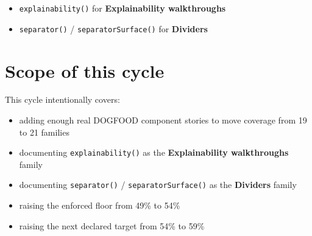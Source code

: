 \begin{itemize}
\tightlist
\item
  \texttt{e\allowbreak{}x\allowbreak{}p\allowbreak{}l\allowbreak{}a\allowbreak{}i\allowbreak{}n\allowbreak{}a\allowbreak{}b\allowbreak{}i\allowbreak{}l\allowbreak{}i\allowbreak{}t\allowbreak{}y\allowbreak{}(\allowbreak{})} for \textbf{Explainability walkthroughs}
\item
  \texttt{s\allowbreak{}e\allowbreak{}p\allowbreak{}a\allowbreak{}r\allowbreak{}a\allowbreak{}t\allowbreak{}o\allowbreak{}r\allowbreak{}(\allowbreak{})} / \texttt{s\allowbreak{}e\allowbreak{}p\allowbreak{}a\allowbreak{}r\allowbreak{}a\allowbreak{}t\allowbreak{}o\allowbreak{}r\allowbreak{}S\allowbreak{}u\allowbreak{}r\allowbreak{}f\allowbreak{}a\allowbreak{}c\allowbreak{}e\allowbreak{}(\allowbreak{})} for \textbf{Dividers}
\end{itemize}

\section{Scope of this cycle}\label{record-074-scope-of-this-cycle}

This cycle intentionally covers:

\begin{itemize}
\tightlist
\item
  adding enough real DOGFOOD component stories to move coverage from 19 to 21 families
\item
  documenting \texttt{e\allowbreak{}x\allowbreak{}p\allowbreak{}l\allowbreak{}a\allowbreak{}i\allowbreak{}n\allowbreak{}a\allowbreak{}b\allowbreak{}i\allowbreak{}l\allowbreak{}i\allowbreak{}t\allowbreak{}y\allowbreak{}(\allowbreak{})} as the \textbf{Explainability walkthroughs} family
\item
  documenting \texttt{s\allowbreak{}e\allowbreak{}p\allowbreak{}a\allowbreak{}r\allowbreak{}a\allowbreak{}t\allowbreak{}o\allowbreak{}r\allowbreak{}(\allowbreak{})} / \texttt{s\allowbreak{}e\allowbreak{}p\allowbreak{}a\allowbreak{}r\allowbreak{}a\allowbreak{}t\allowbreak{}o\allowbreak{}r\allowbreak{}S\allowbreak{}u\allowbreak{}r\allowbreak{}f\allowbreak{}a\allowbreak{}c\allowbreak{}e\allowbreak{}(\allowbreak{})} as the \textbf{Dividers} family
\item
  raising the enforced floor from 49\% to 54\%
\item
  raising the next declared target from 54\% to 59\%
\end{itemize}

